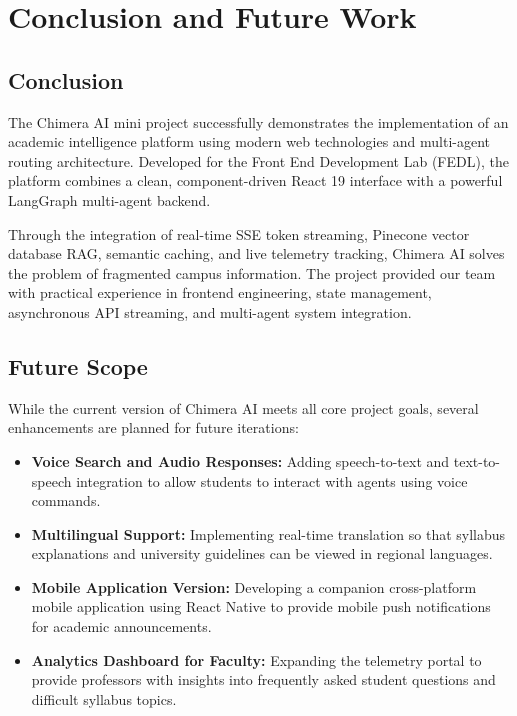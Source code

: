 \chapter{Conclusion and Future Work}

\section{Conclusion}
The Chimera AI mini project successfully demonstrates the implementation of an academic intelligence platform using modern web technologies and multi-agent routing architecture. Developed for the Front End Development Lab (FEDL), the platform combines a clean, component-driven React 19 interface with a powerful LangGraph multi-agent backend.

Through the integration of real-time SSE token streaming, Pinecone vector database RAG, semantic caching, and live telemetry tracking, Chimera AI solves the problem of fragmented campus information. The project provided our team with practical experience in frontend engineering, state management, asynchronous API streaming, and multi-agent system integration.

\section{Future Scope}
While the current version of Chimera AI meets all core project goals, several enhancements are planned for future iterations:
\begin{itemize}
    \item \textbf{Voice Search and Audio Responses:} Adding speech-to-text and text-to-speech integration to allow students to interact with agents using voice commands.
    \item \textbf{Multilingual Support:} Implementing real-time translation so that syllabus explanations and university guidelines can be viewed in regional languages.
    \item \textbf{Mobile Application Version:} Developing a companion cross-platform mobile application using React Native to provide mobile push notifications for academic announcements.
    \item \textbf{Analytics Dashboard for Faculty:} Expanding the telemetry portal to provide professors with insights into frequently asked student questions and difficult syllabus topics.
\end{itemize}
